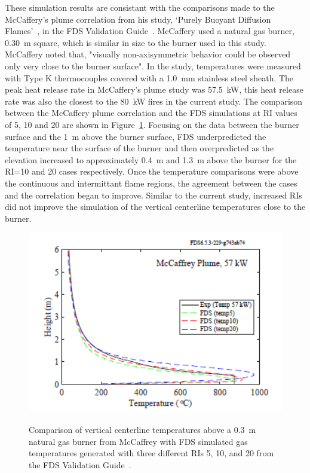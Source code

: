 \documentclass[twoside]{uocthesis}
\begin{document}
{These simulation results are consistant with the comparisons made to the McCaffery's plume correlation from his study, `Purely Buoyant Diffusion Flames'~\cite{McCaffrey:1979}, in the FDS Validation Guide~\cite{FDS_Validation_Guide}. McCaffery used a natural gas burner, 0.30~m square, which is similar in size to the burner used in this study.  McCaffery noted that, "visually non-axisymmetric behavior could be observed only very close to the burner surface".  In the study, temperatures were measured with Type K thermocouples covered with a 1.0~mm stainless steel sheath. The peak heat release rate in McCaffery's plume study was 57.5~kW, this heat release rate was also the closest to the 80~kW fires in the current study.  The comparison between the McCaffery plume correlation and the FDS simulations at RI values of 5, 10 and 20 are shown in Figure~\ref{McCaffrey_Plume_comp}. Focusing on the data between the burner surface and the 1~m above the burner surface, FDS underpredicted the temperature near the surface of the burner and then overpredicted as the elevation increased to approximately 0.4~m and 1.3~m above the burner for the RI=10 and 20 cases respectively. Once the temperature comparisons were above the continuous and intermittant flame regions, the agreement between the cases and the correlation began to improve.  Similar to the current study, increased RIs did not improve the simulation of the vertical centerline temperatures close to the burner.   

\begin{figure}
	\includegraphics[width=5in] {../Figures/McCaffrey_Plume_comp}  \\
	\caption[Comparison of vertical centerline temperatures above a 0.3~m natural gas burner from McCaffrey with FDS simulated gas temperatures.] {Comparison of vertical centerline temperatures above a 0.3~m natural gas burner from McCaffrey with FDS simulated gas temperatures generated with three different RIs 5, 10, and 20 from the FDS Validation Guide~\cite{FDS_Validation_Guide}.}
	\label{McCaffrey_Plume_comp}
\end{figure}

}
\end{document}
